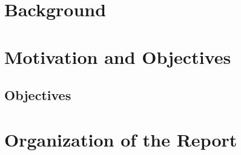 \section{Background}



\section{Motivation and Objectives}



\subsection{Objectives}


\section{Organization of the Report}
